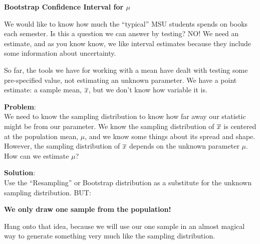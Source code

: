 \def\theTopic{Textbook Costs}
\def\dayNum{11 }


\begin{center}
{\bf {\large \textbf{Bootstrap  Confidence Interval for $\mu$}}}
\end{center}

We would like to know how much the ``typical'' MSU students spends on
books each semester.  Is this a question we can answer by testing?
NO!  We need an estimate, and as you know know, we like interval
estimates because they include some information about uncertainty.

So far, the tools we have for working with a mean have dealt with
testing some pre-specified value, not estimating an unknown parameter.
We have a point estimate: a sample mean, $\overline{x}$, but we don't know how
variable it is. 

{\bf Problem}:\\
We need to know the sampling distribution to know how far away our
statistic might be from our parameter.  We know the sampling
distribution of $ \overline{x}$ is centered at the population mean, $\mu$, and
we know some things about its spread and shape.   However, the sampling
distribution  of $ \overline{x}$ depends on the unknown parameter $\mu$. How
can we estimate $\mu$? 


{\bf Solution}:\\Use the ``Resampling'' or Bootstrap distribution as a
substitute for the unknown sampling distribution. BUT:
\vspace{-.2in}
\begin{center}
	{\bf\sf	We only draw {\bf one} sample from the population!}
\end{center}

Hang onto that idea, because we will use our one sample  in an almost
magical way to generate something very much like the sampling
distribution.   


